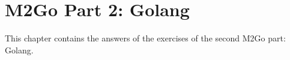 \chapter{M2Go Part 2: Golang}
\label{cha:golang}
This chapter contains the answers of the exercises of the second M2Go part: Golang.









